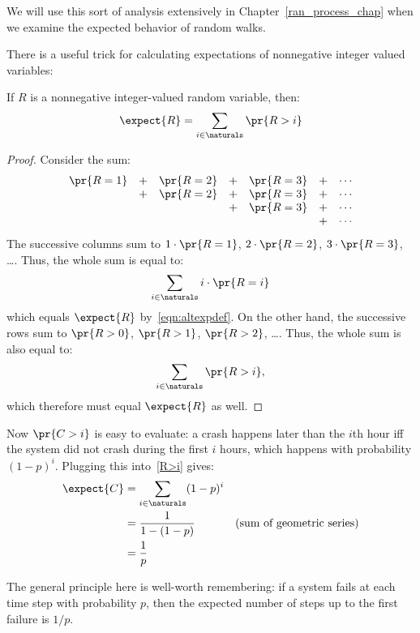 \begin{editingnotes}
We will use this sort of analysis extensively in
Chapter~\ref{ran_process_chap} when we examine the expected behavior
of random walks.

There is a useful trick for
calculating expectations of nonnegative integer valued variables:
\begin{lemma}
If $R$ is a nonnegative integer-valued random variable, then:
%
\begin{equation}\label{R>i}
\expect{R} = \sum_{i \in \naturals} \pr{R > i}
\end{equation}
\end{lemma}

\begin{proof}
Consider the sum:
%
\[
\begin{array}{ccccccc}
\pr{R = 1} & + & \pr{R = 2} & + & \pr{R = 3} & + & \cdots \\
           & + & \pr{R = 2} & + & \pr{R = 3} & + & \cdots \\
           &   &            & + & \pr{R = 3} & + & \cdots \\
           &   &            &   &            & + & \cdots
\end{array}
\]
%
The successive columns sum to $1 \cdot \pr{R = 1}$, $2 \cdot \pr{R = 2}$,
$3 \cdot \pr{R = 3}$, \dots.  Thus, the whole sum is equal to:
%
\[
\sum_{i \in \naturals} i \cdot \pr{R = i}
\]
which equals $\expect{R}$ by~\eqref{eqn:altexpdef}.  On the other hand, the
successive rows sum to $\pr{R > 0}$, $\pr{R > 1}$, $\pr{R > 2}$, \dots.
Thus, the whole sum is also equal to:
%
\[
\sum_{i \in \naturals} \pr{R > i},
\]
%
which therefore must equal $\expect{R}$ as well.
\end{proof}

Now $\pr{C > i}$ is easy to evaluate: a crash happens later than the $i$th
hour iff the system did not crash during the first $i$ hours, which
happens with probability $(1-p)^i$.  Plugging this into~\eqref{R>i} gives:
%
\begin{align*}
\expect{C} & = \sum_{i \in \naturals} (1-p)^i \\
       & = \frac{1}{1 - (1-p)} & \text{(sum of geometric series)}\\
       & = \frac{1}{p}
\end{align*}

The general principle here is well-worth
remembering: if a system fails at each time step with probability $p$,
then the expected number of steps up to the first failure is $1 / p$.

\end{editingnotes}

